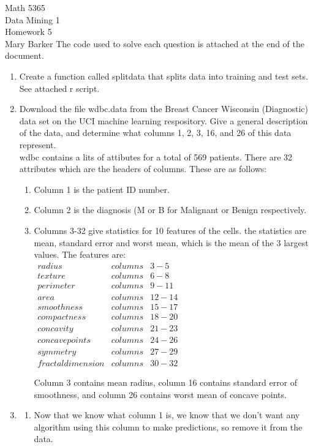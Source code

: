 \documentclass[11pt]{article}
\begin{document}
\noindent\large{Math 5365}\\
\large{Data Mining 1}\\
\large{Homework 5}\\
\large{Mary Barker}
\newline
\doublespace
The code used to solve each question is attached at the end of the document. 

\begin{enumerate}
\item Create a function called splitdata that splits data into training and test sets.\\
See attached r script.

\item Download the file wdbc.data from the Breast Cancer Wisconsin (Diagnostic) 
data set on the UCI machine learning respository. Give a general description of the 
data, and determine what columns 1, 2, 3, 16, and 26 of this data represent.\\
wdbc contains a lits of attibutes for a total of 569 patients. There are 32 
attributes which are the headers of columns. These are as follows: 
\begin{enumerate}
\item Column 1 is the patient ID number.
\item Column 2 is the diagnosis (M or B for Malignant or Benign respectively. 
\item Columns 3-32 give statistics for 10 features of the cells. 
the statistics are mean, standard error and worst mean, which is the mean of the 
3 largest values. The features are: \\
$
\begin{array}{LRl}
radius & columns & 3-5\\
texture & columns & 6-8\\
perimeter & columns & 9-11\\
area & columns & 12-14\\
smoothness & columns & 15-17\\
compactness & columns & 18-20\\
concavity & columns & 21-23\\
concave points & columns & 24-26\\
symmetry & columns & 27-29\\
fractal dimension & columns & 30-32
\end{array}
$

Column 3 contains mean radius, column 16 contains standard error of smoothness, and 
column 26 contains worst mean of concave points.
\end{enumerate}
\item 
\begin{enumerate}
\item Now that we know what column 1 is, we know that we don't want any algorithm 
using this column to make predictions, so remove it from the data.\\


\end{enumerate}
\end{enumerate}
\end{document}
